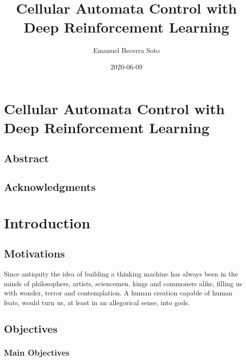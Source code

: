 \documentclass[
]{book}
\title{Cellular Automata Control with Deep Reinforcement Learning}
\author{Emanuel Becerra Soto}
\date{2020-06-09}
\begin{document}
\maketitle

{
\setcounter{tocdepth}{1}
\tableofcontents
}
\hypertarget{cellular-automata-control-with-deep-reinforcement-learning}{%
\chapter{Cellular Automata Control with Deep Reinforcement Learning}\label{cellular-automata-control-with-deep-reinforcement-learning}}

\hypertarget{abstract}{%
\section{Abstract}\label{abstract}}

\hypertarget{acknowledgments}{%
\section{Acknowledgments}\label{acknowledgments}}

\hypertarget{introduction}{%
\chapter{Introduction}\label{introduction}}

\hypertarget{motivations}{%
\section{Motivations}\label{motivations}}

Since antiquity the idea of building a thinking machine has always been in the minds of philosophers, artists, sciencemen, kings and commoners alike, filling us with wonder, terror and contemplation. A human creation capable of human feats, would turn us, at least in an allegorical sense, into gods.

\hypertarget{objectives}{%
\section{Objectives}\label{objectives}}

\hypertarget{main-objectives}{%
\subsection{Main Objectives}\label{main-objectives}}
\end{document}
